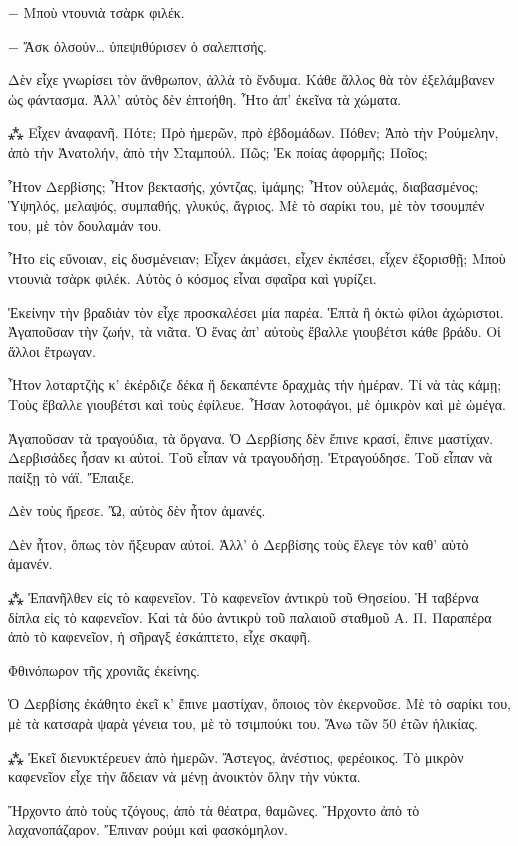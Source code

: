 \documentclass{article}
\begin{document}
− Μποὺ ντουνιὰ τσὰρκ φιλέκ.

− Ἄσκ ὀλσούν… ὑπεψιθύρισεν ὁ σαλεπτσής.

Δὲν εἶχε γνωρίσει τὸν ἄνθρωπον, ἀλλὰ τὸ ἔνδυμα. Κάθε ἄλλος θὰ τὸν ἐξελάμβανεν ὡς φάντασμα. Ἀλλ' αὐτὸς δὲν ἐπτοήθη. Ἦτο ἀπ' ἐκεῖνα τὰ χώματα.

⁂
Εἶχεν ἀναφανῆ. Πότε; Πρὸ ἡμερῶν, πρὸ ἑβδομάδων. Πόθεν; Ἀπὸ τὴν Ρούμελην, ἀπὸ τὴν Ἀνατολήν, ἀπὸ τὴν Σταμπούλ. Πῶς; Ἐκ ποίας ἀφορμῆς; Ποῖος;

Ἦτον Δερβίσης; Ἦτον βεκτασής, χόντζας, ἰμάμης; Ἦτον οὐλεμάς, διαβασμένος; Ὑψηλός, μελαψός, συμπαθής, γλυκύς, ἄγριος. Μὲ τὸ σαρίκι του, μὲ τὸν τσουμπέν του, μὲ τὸν δουλαμάν του.

Ἦτο εἰς εὔνοιαν, εἰς δυσμένειαν; Εἶχεν ἀκμάσει, εἶχεν ἐκπέσει, εἶχεν ἐξορισθῇ; Μποὺ ντουνιὰ τσὰρκ φιλέκ. Αὐτὸς ὁ κόσμος εἶναι σφαῖρα καὶ γυρίζει.

Ἐκείνην τὴν βραδιὰν τὸν εἶχε προσκαλέσει μία παρέα. Ἑπτὰ ἢ ὀκτὼ φίλοι ἀχώριστοι. Ἀγαποῦσαν τὴν ζωήν, τὰ νιᾶτα. Ὁ ἕνας ἀπ' αὐτοὺς ἔβαλλε γιουβέτσι κάθε βράδυ. Οἱ ἄλλοι ἔτρωγαν.

Ἦτον λοταρτζὴς κ' ἐκέρδιζε δέκα ἢ δεκαπέντε δραχμὰς τὴν ἡμέραν. Τί νὰ τὰς κάμῃ; Τοὺς ἔβαλλε γιουβέτσι καὶ τοὺς ἐφίλευε. Ἦσαν λοτοφάγοι, μὲ ὀμικρὸν καὶ μὲ ὠμέγα.

Ἀγαποῦσαν τὰ τραγούδια, τὰ ὄργανα. Ὁ Δερβίσης δὲν ἔπινε κρασί, ἔπινε μαστίχαν. Δερβισάδες ἦσαν κι αὐτοί. Τοῦ εἶπαν νὰ τραγουδήσῃ. Ἐτραγούδησε. Τοῦ εἶπαν νὰ παίξῃ τὸ νάϊ. Ἔπαιξε.

Δὲν τοὺς ἤρεσε. Ὤ, αὐτὸς δὲν ἦτον ἀμανές.

Δὲν ἦτον, ὅπως τὸν ἤξευραν αὐτοί. Ἀλλ' ὁ Δερβίσης τοὺς ἔλεγε τὸν καθ' αὑτὸ ἀμανέν.

⁂
Ἐπανῆλθεν εἰς τὸ καφενεῖον. Τὸ καφενεῖον ἀντικρὺ τοῦ Θησείου. Ἡ ταβέρνα δίπλα εἰς τὸ καφενεῖον. Καὶ τὰ δύο ἀντικρὺ τοῦ παλαιοῦ σταθμοῦ Α. Π. Παραπέρα ἀπὸ τὸ καφενεῖον, ἡ σῆραγξ ἐσκάπτετο, εἶχε σκαφῆ.

Φθινόπωρον τῆς χρονιᾶς ἐκείνης.

Ὁ Δερβίσης ἐκάθητο ἐκεῖ κ' ἔπινε μαστίχαν, ὅποιος τὸν ἐκερνοῦσε. Μὲ τὸ σαρίκι του, μὲ τὰ κατσαρὰ ψαρὰ γένεια του, μὲ τὸ τσιμπούκι του. Ἄνω τῶν 50 ἐτῶν ἡλικίας.

⁂
Ἐκεῖ διενυκτέρευεν ἀπὸ ἡμερῶν. Ἄστεγος, ἀνέστιος, φερέοικος. Τὸ μικρὸν καφενεῖον εἶχε τὴν ἄδειαν νὰ μένῃ ἀνοικτὸν ὅλην τὴν νύκτα.

Ἤρχοντο ἀπὸ τοὺς τζόγους, ἀπὸ τὰ θέατρα, θαμῶνες. Ἤρχοντο ἀπὸ τὸ λαχανοπάζαρον. Ἔπιναν ρούμι καὶ φασκόμηλον.
\end{document}
